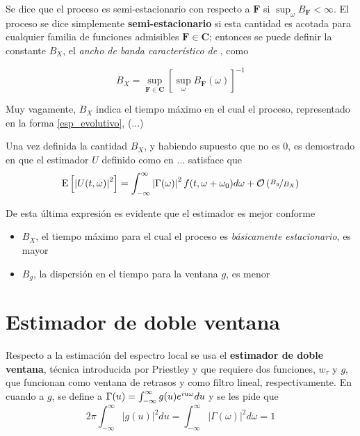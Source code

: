 Se dice que el proceso es semi-estacionario con respecto a $\mathbf{F}$ si 
$\sup_\omega B_{\mathbf{F}} < \infty$. El proceso se dice simplemente \textbf{semi-estacionario} 
si esta cantidad es acotada para cualquier familia de funciones admisibles 
$\mathbf{F} \in \mathbf{C}$; entonces se puede definir la constante $B_X$, el \textit{ancho de 
banda característico de} \xt, como

\begin{equation}
B_X = \sup_{\mathbf{F}\in \mathbf{C}} \left[ \sup_\omega B_{\mathbf{F}}(\omega) \right]^{-1}
\end{equation}

Muy vagamente, $B_X$ indica el tiempo máximo en el cual el proceso, representado en la forma
\ref{esp_evolutivo}, (...)

Una vez definida la cantidad $B_X$, y habiendo supuesto que no es 0, es demostrado en 
\cite{Priestley65} que el estimador $U$ definido como en ... satisface que
%
\begin{equation}
\mathrm{E}\left[ \left| U(t,\omega) \right|^{2} \right] = \int_{-\infty}^{\infty} \left| \Gamma(\omega) \right|^{2} f(t,\omega+\omega_0) d\omega
+ \mathcal{O}\left( \nicefrac{B_g}{B_X} \right)
\end{equation}

De esta última expresión es evidente que el estimador es mejor conforme 
\begin{itemize}
\item  $B_X$, el tiempo máximo para el cual el proceso es \textit{básicamente estacionario}, es 
mayor
\item $B_g$, la dispersión en el tiempo para la ventana $g$, es menor
\end{itemize}

%

\section{Estimador de doble ventana}

Respecto a la estimación del espectro local se usa el \textbf{estimador de doble ventana}, 
técnica introducida por Priestley \cite{Priestley69} y que requiere dos funciones, $w_\tau$ y 
$g$, que funcionan como ventana de retrasos y como filtro lineal, respectivamente.
%
En cuando a $g$, se define a $\Gamma(u) = \int_{-\infty}^{\infty} g(u) e^{i u \omega} du$ y se les pide que
\begin{equation*}
2\pi \int_{-\infty}^{\infty} \lvert g(u) \lvert^{2} du 
= 
\int_{-\infty}^{\infty} \lvert \Gamma(\omega) \lvert^{2} d\omega
= 1
\end{equation*}

